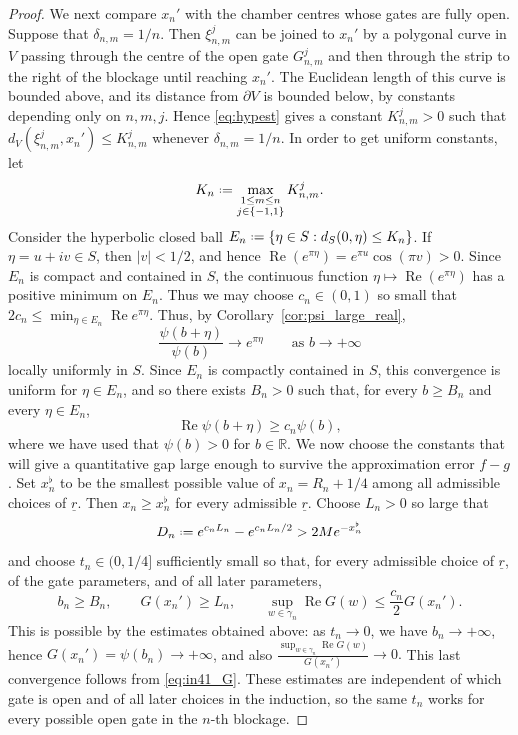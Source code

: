 \documentclass[a4paper, 11pt, reqno]{amsart}
\numberwithin{equation}{section}
\theoremstyle{plain}
\newcommand*{\defeq}{\mathrel{\vcenter{\baselineskip0.5ex \lineskiplimit0pt
 \hbox{\scriptsize.}\hbox{\scriptsize.}}}=}
\theoremstyle{remark}
\newcommand{\R}{{\mathbb{R}}}
\newcommand{\ulr}{\underline{r}}
\newcommand{\Rea}{\operatorname{Re }}
\begin{document}
\begin{proof}
	We next compare \(x_n'\) with the chamber centres whose gates are fully open. Suppose that \(\delta_{n,m}=1/n\). Then \(\xi^j_{n,m}\) can be joined to \(x_n'\) by a polygonal curve in \(V\) passing through the centre of the open gate \(G^j_{n,m}\) and then through the strip to the right of the blockage until reaching $x_n'$. The Euclidean length of this curve is bounded above, and its distance from \(\partial V\) is bounded below, by constants depending only on \(n,m,j\). Hence \eqref{eq:hypest} gives a constant \(K^j_{n,m}>0\) such that
	$
	d_V(\xi^j_{n,m},x_n')\le K^j_{n,m}
	$
	whenever \(\delta_{n,m}=1/n\). In order to get uniform constants, let
	\[
	K_n\defeq
	\max_{\substack{1\le m\le n\\ j\in\{-1,1\}}}K^j_{n,m}.
	\]
	Consider the hyperbolic closed ball
	$
	E_n\defeq\{\eta\in S:d_S(0,\eta)\le K_n\}$. If \(\eta=u+iv\in S\), then \(|v|<1/2\), and hence
	$
	\Rea(e^{\pi\eta})=e^{\pi u}\cos(\pi v)>0.
	$
	Since \(E_n\) is compact and contained in \(S\), the continuous function
	\(\eta\mapsto \Rea(e^{\pi\eta})\) has a positive minimum on \(E_n\). Thus
	we may choose \(c_n\in(0,1)\) so small that
	$
	2c_n\le \min_{\eta\in E_n}\Rea e^{\pi\eta}.
	$ Thus, by Corollary~\ref{cor:psi_large_real},
	\[
	\frac{\psi(b+\eta)}{\psi(b)}\longrightarrow e^{\pi\eta}
	\qquad\text{as } b\to+\infty
	\]
	locally uniformly in \(S\). Since \(E_n\) is compactly contained in \(S\),
	this convergence is uniform for \(\eta\in E_n\), and so there exists \(B_n>0\) such that, for every \(b\ge B_n\) and every
	\(\eta\in E_n\),
	\[
	\Rea\psi(b+\eta)\ge c_n\psi(b),
	\]
	where we have used that \(\psi(b)>0\) for \(b\in\R\).
	We now choose the constants that will give a quantitative gap large enough
	to survive the approximation error \(f-g\). Set \(x_n^\flat\) to be the smallest possible value of \(x_n=R_n+1/4\) among all admissible choices of \(\ulr\). Then \(x_n\ge x_n^\flat\) for every admissible \(\ulr\). Choose \(L_n>0\) so large that
	\[
	D_n\defeq e^{c_nL_n}-e^{c_nL_n/2}>2Me^{-x_n^\flat}
	\]
	and choose \(t_n\in(0,1/4]\) sufficiently small so that, for every
	admissible choice of \(\ulr\), of the gate parameters, and of all later
	parameters,
	\[
	b_n\ge B_n,\qquad
	G(x_n')\ge L_n,\qquad
	\sup_{w\in\gamma_n}\Rea G(w)\le \frac{c_n}{2}G(x_n').
	\]
	This is possible by the estimates obtained above: as \(t_n\to0\), we have
	\(b_n\to+\infty\), hence \(G(x_n')=\psi(b_n)\to+\infty\), and also
	$
	\frac{\sup_{w\in\gamma_n}\Rea G(w)}{G(x_n')}\to0.
	$
	This last convergence follows from \eqref{eq:in41_G}.
	These estimates are independent of which gate is open and of all later
	choices in the induction, so the same \(t_n\) works for every possible open
	gate in the \(n\)-th blockage.
	

\end{proof}
\end{document}

